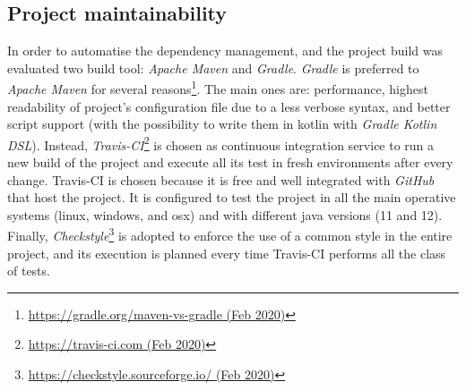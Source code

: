 \subsection*{Project maintainability}
In order to automatise the dependency management, and the project build was evaluated two build tool: \textit{Apache Maven} and \textit{Gradle}.
\textit{Gradle} is preferred to \textit{Apache Maven} for several reasons\footnote{\href{https://gradle.org/maven-vs-gradle/}{https://gradle.org/maven-vs-gradle (Feb 2020)}}. The main ones are: performance, highest readability of project's configuration file due to a less verbose syntax, and better script support (with the possibility to write them in kotlin with \textit{Gradle Kotlin DSL}).
Instead, \textit{Travis-CI}\footnote{\href{https://travis-ci.com/}{https://travis-ci.com (Feb 2020)}} is chosen as continuous integration service to run a new build of the project and execute all its test in fresh environments after every change.
Travis-CI is chosen because it is free and well integrated with \textit{GitHub} that host the project.
It is configured to test the project in all the main operative systems (linux, windows, and osx) and with different java versions (11 and 12).
Finally, \textit{Checkstyle}\footnote{\href{https://checkstyle.sourceforge.io/}{https://checkstyle.sourceforge.io/ (Feb 2020)}} is adopted to enforce the use of a common style in the entire project, and its execution is planned every time Travis-CI performs all the class of tests. 

